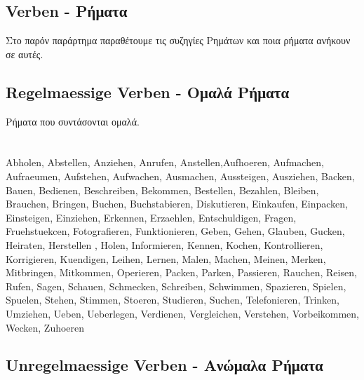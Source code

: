 
\begin{appendix}
 
 \section{Verben - Ρήματα}
 
 Στο παρόν παράρτημα παραθέτουμε τις συζηγίες Ρημάτων και ποια ρήματα ανήκουν σε αυτές.
 
 \subsection{Regelmaessige Verben - Ομαλά Ρήματα}
 Ρήματα που συντάσονται ομαλά. \\ 
  \\ 
  \\
 
 \gls{Abholen}, \gls{Abstellen}, \gls{Anziehen}, \gls{Anrufen},
 \gls{Anstellen},\gls{Aufhoeren}, \gls{Aufmachen}, \gls{Aufraeumen},
\gls{Aufstehen}, \gls{Aufwachen}, \gls{Ausmachen}, \gls{Aussteigen},
\gls{Ausziehen}, \gls{Backen}, \gls{Bauen}, \gls{Bedienen}, \gls{Beschreiben},
\gls{Bekommen}, \gls{Bestellen}, \gls{Bezahlen}, \gls{Bleiben}, \gls{Brauchen},
\gls{Bringen}, \gls{Buchen}, \gls{Buchstabieren}, \gls{Diskutieren},
\gls{Einkaufen}, \gls{Einpacken}, \gls{Einsteigen}, \gls{Einziehen},
\gls{Erkennen}, \gls{Erzaehlen}, \gls{Entschuldigen}, \gls{Fragen},
\gls{Fruehstuekcen}, \gls{Fotografieren}, \gls{Funktionieren}, \gls{Geben},
\gls{Gehen}, \gls{Glauben}, \gls{Gucken}, \gls{Heiraten}, \gls{Herstellen} ,
\gls{Holen}, \gls{Informieren}, \gls{Kennen}, \gls{Kochen},
\gls{Kontrollieren}, \gls{Korrigieren}, \gls{Kuendigen}, \gls{Leihen},
\gls{Lernen}, \gls{Malen}, \gls{Machen}, \gls{Meinen}, \gls{Merken},
\gls{Mitbringen}, \gls{Mitkommen}, \gls{Operieren}, \gls{Packen},
\gls{Parken}, \gls{Passieren}, \gls{Rauchen}, \gls{Reisen}, \gls{Rufen},
\gls{Sagen}, \gls{Schauen}, \gls{Schmecken}, \gls{Schreiben}, \gls{Schwimmen},
\gls{Spazieren}, \gls{Spielen}, \gls{Spuelen}, \gls{Stehen}, \gls{Stimmen},
\gls{Stoeren}, \gls{Studieren}, \gls{Suchen}, \gls{Telefonieren}, 
\gls{Trinken}, \gls{Umziehen}, \gls{Ueben}, \gls{Ueberlegen}, \gls{Verdienen},
\gls{Vergleichen}, \gls{Verstehen}, \gls{Vorbeikommen}, \gls{Wecken},
\gls{Zuhoeren}
 
 \subsection{Unregelmaessige Verben - Ανώμαλα Ρήματα}
 

\end{appendix}
